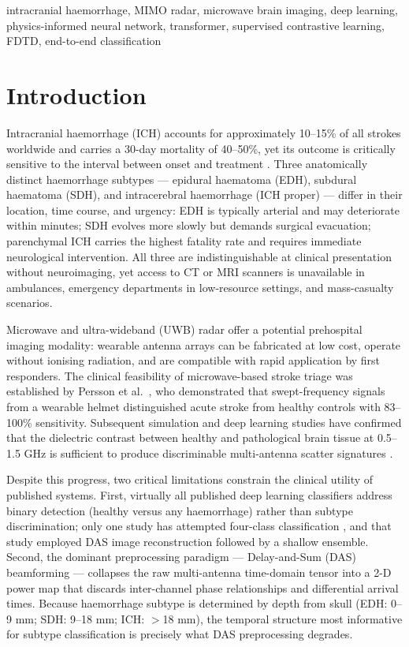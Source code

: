 \documentclass[journal]{IEEEtran}
\begin{document}
\begin{IEEEkeywords}
intracranial haemorrhage, MIMO radar, microwave brain imaging,
deep learning, physics-informed neural network, transformer,
supervised contrastive learning, FDTD, end-to-end classification
\end{IEEEkeywords}

\section{Introduction}
\label{sec:intro}

Intracranial haemorrhage (ICH) accounts for approximately
10--15\% of all strokes worldwide and carries a 30-day
mortality of 40--50\%, yet its outcome is critically sensitive
to the interval between onset and treatment \cite{Krishnamurthi2013}.
Three anatomically distinct haemorrhage subtypes --- epidural
haematoma (EDH), subdural haematoma (SDH), and intracerebral
haemorrhage (ICH proper) --- differ in their location, time
course, and urgency: EDH is typically arterial and may
deteriorate within minutes; SDH evolves more slowly but
demands surgical evacuation; parenchymal ICH carries the
highest fatality rate and requires immediate neurological
intervention.  All three are indistinguishable at clinical
presentation without neuroimaging, yet access to CT or MRI
scanners is unavailable in ambulances, emergency departments
in low-resource settings, and mass-casualty scenarios.

Microwave and ultra-wideband (UWB) radar offer a potential
prehospital imaging modality: wearable antenna arrays can be
fabricated at low cost, operate without ionising radiation,
and are compatible with rapid application by first responders.
The clinical feasibility of microwave-based stroke triage was
established by Persson et al.\ \cite{Persson2014}, who
demonstrated that swept-frequency signals from a wearable
helmet distinguished acute stroke from healthy controls with
83--100\% sensitivity.  Subsequent simulation and deep
learning studies have confirmed that the dielectric contrast
between healthy and pathological brain tissue at 0.5--1.5 GHz
is sufficient to produce discriminable multi-antenna scatter
signatures \cite{Hossain2020,Fhager2019,Alon2021}.

Despite this progress, two critical limitations constrain the
clinical utility of published systems.  First, virtually all
published deep learning classifiers address binary detection
(healthy versus any haemorrhage) rather than subtype
discrimination; only one study has attempted four-class
classification \cite{Yin2021}, and that study employed DAS
image reconstruction followed by a shallow ensemble.  Second,
the dominant preprocessing paradigm --- Delay-and-Sum (DAS)
beamforming --- collapses the raw multi-antenna time-domain
tensor into a 2-D power map that discards inter-channel phase
relationships and differential arrival times.  Because
haemorrhage subtype is determined by depth from skull (EDH:
0--9 mm; SDH: 9--18 mm; ICH: $>$18 mm), the temporal
structure most informative for subtype classification is
precisely what DAS preprocessing degrades.
\end{document}
